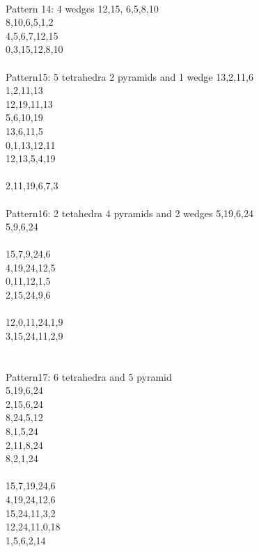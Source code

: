 \documentclass[twocolumn]{article}
\begin{document}
 \\
\tiny Pattern 14: 4 wedges
\tiny 12,15, 6,5,8,10 \\
\tiny 8,10,6,5,1,2 \\
\tiny 4,5,6,7,12,15 \\
\tiny 0,3,15,12,8,10 \\

 \\
\tiny Pattern15: 5 tetrahedra 2 pyramids and 1 wedge
\tiny 13,2,11,6 \\
\tiny 1,2,11,13 \\
\tiny 12,19,11,13 \\
\tiny 5,6,10,19 \\
\tiny 13,6,11,5
\tiny   \\
\tiny 0,1,13,12,11 \\
\tiny 12,13,5,4,19 \\
\tiny   \\
\tiny 2,11,19,6,7,3 \\
%
%
 \\
\tiny Pattern16: 2 tetahedra 4 pyramids and 2 wedges
\tiny  5,19,6,24\\
\tiny  5,9,6,24\\
\tiny  \\
\tiny  15,7,9,24,6 \\
\tiny  4,19,24,12,5 \\
\tiny  0,11,12,1,5 \\
\tiny  2,15,24,9,6 \\
\tiny  \\
\tiny  12,0,11,24,1,9\\
\tiny  3,15,24,11,2,9\\
\tiny  \\

 \\
\tiny  Pattern17: 6 tetrahedra and 5 pyramid\\
\tiny  5,19,6,24 \\
\tiny  2,15,6,24 \\
\tiny  8,24,5,12 \\
\tiny  8,1,5,24 \\
\tiny  2,11,8,24\\
\tiny  8,2,1,24\\
\tiny  \\
\tiny  15,7,19,24,6\\
\tiny  4,19,24,12,6\\
\tiny  15,24,11,3,2 \\
\tiny  12,24,11,0,18 \\
\tiny  1,5,6,2,14 \\
\tiny  \\
\end{document}
